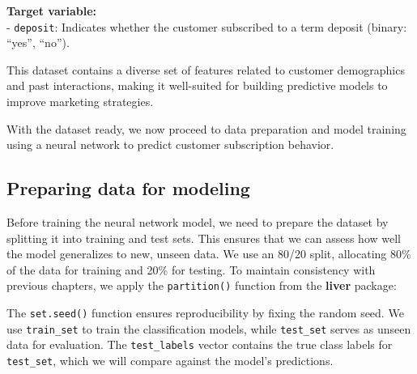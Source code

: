 \documentclass[
  11pt,
]{book}
\makeatletter
\newenvironment{Shaded}{}{}
\newcommand{\AttributeTok}[1]{#1}
\newcommand{\DecValTok}[1]{#1}
\newcommand{\FloatTok}[1]{#1}
\newcommand{\FunctionTok}[1]{#1}
\newcommand{\NormalTok}[1]{#1}
\newcommand{\OtherTok}[1]{\textcolor[rgb]{0.39,0.39,0.39}{#1}}
\newcommand{\SpecialCharTok}[1]{\textcolor[rgb]{0.39,0.39,0.39}{#1}}
\newenvironment{kframe}{%
\medskip{}
\setlength{\fboxsep}{.8em}
 \def\at@end@of@kframe{}%
 \ifinner\ifhmode%
  \def\at@end@of@kframe{\end{minipage}}%
  \begin{minipage}{\columnwidth}%
 \fi\fi%
 \def\FrameCommand##1{\hskip\@totalleftmargin \hskip-\fboxsep
 \colorbox{shadecolor}{##1}\hskip-\fboxsep
     \hskip-\linewidth \hskip-\@totalleftmargin \hskip\columnwidth}%
 \MakeFramed {\advance\hsize-\width
   \@totalleftmargin\z@ \linewidth\hsize
   \@setminipage}}%
 {\par\unskip\endMakeFramed%
 \at@end@of@kframe}
\renewenvironment{Shaded}{\begin{kframe}}{\end{kframe}}
\theoremstyle{definition}
\theoremstyle{definition}
\theoremstyle{definition}
\theoremstyle{definition}
\theoremstyle{remark}
\makeatother
\begin{document}
\textbf{Target variable:}\\
- \texttt{deposit}: Indicates whether the customer subscribed to a term deposit (binary: ``yes'', ``no'').

This dataset contains a diverse set of features related to customer demographics and past interactions, making it well-suited for building predictive models to improve marketing strategies.

With the dataset ready, we now proceed to data preparation and model training using a neural network to predict customer subscription behavior.

\subsection*{Preparing data for modeling}\label{preparing-data-for-modeling-3}


Before training the neural network model, we need to prepare the dataset by splitting it into training and test sets. This ensures that we can assess how well the model generalizes to new, unseen data. We use an 80/20 split, allocating 80\% of the data for training and 20\% for testing. To maintain consistency with previous chapters, we apply the \texttt{partition()} function from the \textbf{liver} package:

\begin{Shaded}
\end{Shaded}

The \texttt{set.seed()} function ensures reproducibility by fixing the random seed. We use \texttt{train\_set} to train the classification models, while \texttt{test\_set} serves as unseen data for evaluation. The \texttt{test\_labels} vector contains the true class labels for \texttt{test\_set}, which we will compare against the model's predictions.
\end{document}
